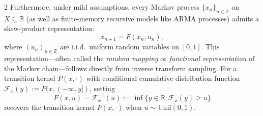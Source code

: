 \documentclass[11pt]{article}
\begin{document}
\begin{multicols}{2}
Furthermore, under mild assumptions, every Markov process $\{x_n\}_{n \in \mathbb{Z}}$ on $X \subseteq \mathbb{R}$ (as well as finite-memory recursive models like ARMA processes) admits a skew-product representation:
\begin{equation}
\label{eq-skew-product-Markov}
x_{n+1} = F(x_n, u_{n}),
\end{equation}
where $(u_n)_{n \in \mathbb{Z}}$ are i.i.d.\ uniform random variables on $[0,1]$. 
This representation—often called the \emph{random mapping} or \emph{functional representation} of the Markov chain—follows directly from inverse transform sampling. For a transition kernel $P(x, \cdot)$ with conditional cumulative distribution function $\mathcal{F}_x(y) := P(x, (-\infty, y])$, setting
\begin{equation}
F(x, u) = \mathcal{F}^{-1}_x(u) := \inf \{ y \in \mathbb{R} : \mathcal{F}_x(y) \ge u \}
\end{equation}
recovers the transition kernel $P(x, \cdot)$ when $u \sim \text{Unif}(0,1)$.



\end{multicols}
\end{document}
